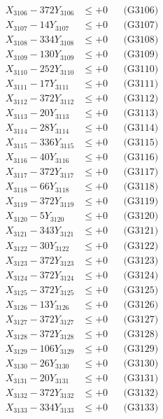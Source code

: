 \documentclass[a4paper,10pt]{article}
\begin{document}
{\begin{align}
X_{3106} - 372Y_{3106} &\leq +0 && \text{(G3106)} \\
X_{3107} - 14Y_{3107} &\leq +0 && \text{(G3107)} \\
X_{3108} - 334Y_{3108} &\leq +0 && \text{(G3108)} \\
X_{3109} - 130Y_{3109} &\leq +0 && \text{(G3109)} \\
X_{3110} - 252Y_{3110} &\leq +0 && \text{(G3110)} \\
\allowbreak
X_{3111} - 17Y_{3111} &\leq +0 && \text{(G3111)} \\
X_{3112} - 372Y_{3112} &\leq +0 && \text{(G3112)} \\
X_{3113} - 20Y_{3113} &\leq +0 && \text{(G3113)} \\
X_{3114} - 28Y_{3114} &\leq +0 && \text{(G3114)} \\
X_{3115} - 336Y_{3115} &\leq +0 && \text{(G3115)} \\
X_{3116} - 40Y_{3116} &\leq +0 && \text{(G3116)} \\
X_{3117} - 372Y_{3117} &\leq +0 && \text{(G3117)} \\
X_{3118} - 66Y_{3118} &\leq +0 && \text{(G3118)} \\
X_{3119} - 372Y_{3119} &\leq +0 && \text{(G3119)} \\
X_{3120} - 5Y_{3120} &\leq +0 && \text{(G3120)} \\
\allowbreak
X_{3121} - 343Y_{3121} &\leq +0 && \text{(G3121)} \\
X_{3122} - 30Y_{3122} &\leq +0 && \text{(G3122)} \\
X_{3123} - 372Y_{3123} &\leq +0 && \text{(G3123)} \\
X_{3124} - 372Y_{3124} &\leq +0 && \text{(G3124)} \\
X_{3125} - 372Y_{3125} &\leq +0 && \text{(G3125)} \\
X_{3126} - 13Y_{3126} &\leq +0 && \text{(G3126)} \\
X_{3127} - 372Y_{3127} &\leq +0 && \text{(G3127)} \\
X_{3128} - 372Y_{3128} &\leq +0 && \text{(G3128)} \\
X_{3129} - 106Y_{3129} &\leq +0 && \text{(G3129)} \\
X_{3130} - 26Y_{3130} &\leq +0 && \text{(G3130)} \\
\allowbreak
X_{3131} - 20Y_{3131} &\leq +0 && \text{(G3131)} \\
X_{3132} - 372Y_{3132} &\leq +0 && \text{(G3132)} \\
X_{3133} - 334Y_{3133} &\leq +0 && \text{(G3133)} \\

\end{align}}
\end{document}
